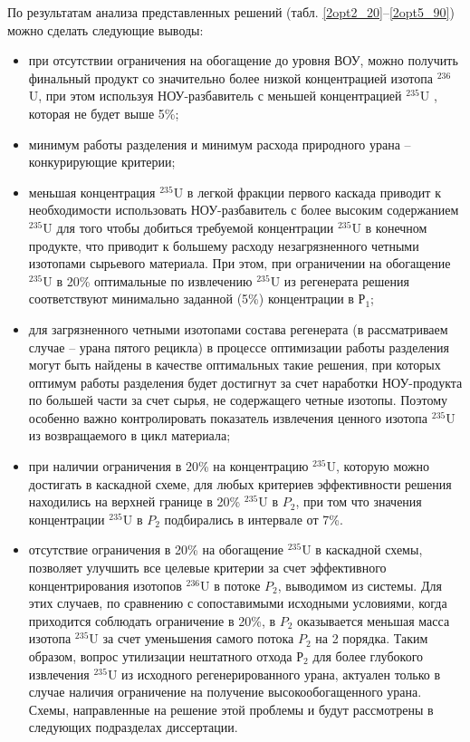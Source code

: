 По результатам анализа представленных решений (табл. \ref{2opt2_20}--\ref{2opt5_90}) можно сделать следующие выводы:
\begin{itemize}
    \item при отсутствии ограничения на обогащение до уровня ВОУ, можно получить финальный продукт со значительно более низкой концентрацией изотопа $^{236}$U, при этом используя НОУ-разбавитель с меньшей концентрацией $^{235}$U , которая не будет выше 5\%;
    \item минимум работы разделения и минимум расхода природного урана -- конкурирующие критерии;
    \item меньшая концентрация $^{235}$U в легкой фракции первого каскада приводит к необходимости использовать НОУ-разбавитель с более высоким содержанием $^{235}$U для того чтобы добиться требуемой концентрации $^{235}$U в конечном продукте, что приводит к большему расходу незагрязненного четными изотопами сырьевого материала. При этом, при ограничении на обогащение $^{235}$U в 20\% оптимальные по извлечению $^{235}$U из регенерата решения соответствуют минимально заданной (5\%) концентрации в $Р_1$;
    \item для загрязненного четными изотопами состава регенерата (в рассматриваем случае -- урана пятого рецикла) в процессе оптимизации работы разделения могут быть найдены в качестве оптимальных такие решения, при которых оптимум работы разделения будет достигнут за счет наработки НОУ-продукта по большей части за счет сырья, не содержащего четные изотопы. Поэтому особенно важно контролировать показатель извлечения ценного изотопа $^{235}$U из возвращаемого в цикл материала;
    \item при наличии ограничения в 20\% на концентрацию $^{235}$U, которую можно достигать в каскадной схеме, для любых критериев эффективности решения находились на верхней границе в 20\% $^{235}$U в $P_2$, при том что значения концентрации $^{235}$U в $P_2$ подбирались в интервале от 7\%.
    \item отсутствие ограничения в 20\% на обогащение $^{235}$U в каскадной схемы, позволяет улучшить все целевые критерии за счет эффективного концентрирования изотопов $^{236}$U в потоке $P_2$, выводимом из системы. Для этих случаев, по сравнению с сопоставимыми исходными условиями, когда приходится соблюдать ограничение в 20\%, в $P_2$ оказывается меньшая масса изотопа $^{235}$U за счет уменьшения самого потока $P_2$ на 2 порядка. Таким образом, вопрос утилизации нештатного отхода $Р_2$ для более глубокого извлечения $^{235}$U из исходного регенерированного урана, актуален только в случае наличия ограничение на получение высокообогащенного урана. Схемы, направленные на решение этой проблемы и будут рассмотрены в следующих подразделах диссертации.
\end{itemize}



